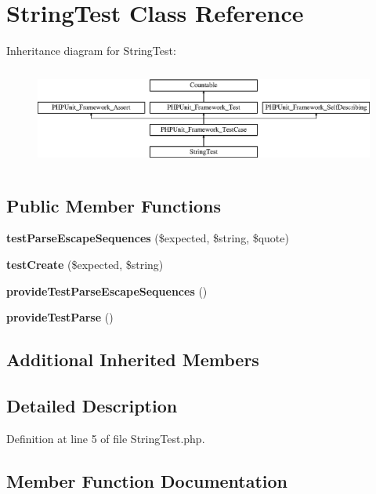 \section{String\+Test Class Reference}
\label{class_php_parser_1_1_node_1_1_scalar_1_1_string_test}
Inheritance diagram for String\+Test\+:\begin{figure}[H]
\begin{center}
\leavevmode
\includegraphics[height=3.303835cm]{class_php_parser_1_1_node_1_1_scalar_1_1_string_test}
\end{center}
\end{figure}
\subsection*{Public Member Functions}
\begin{DoxyCompactItemize}
\item 
{\bf test\+Parse\+Escape\+Sequences} (\$expected, \$string, \$quote)
\item 
{\bf test\+Create} (\$expected, \$string)
\item 
{\bf provide\+Test\+Parse\+Escape\+Sequences} ()
\item 
{\bf provide\+Test\+Parse} ()
\end{DoxyCompactItemize}
\subsection*{Additional Inherited Members}


\subsection{Detailed Description}


Definition at line 5 of file String\+Test.\+php.



\subsection{Member Function Documentation}
